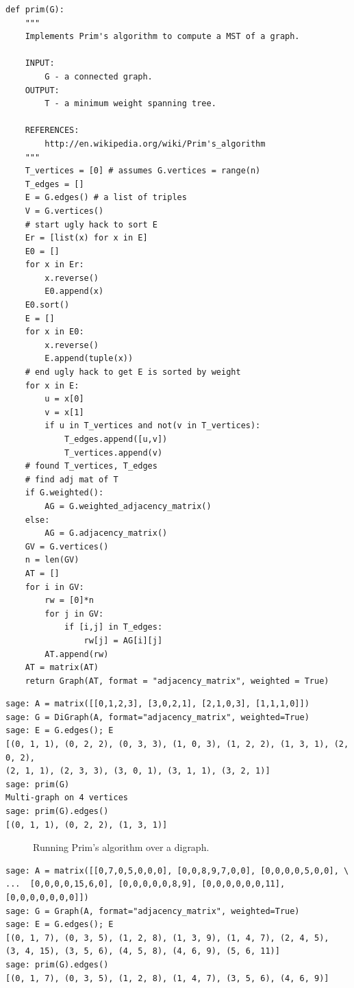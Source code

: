 \begin{lstlisting}
def prim(G):
    """
    Implements Prim's algorithm to compute a MST of a graph.

    INPUT:
        G - a connected graph.
    OUTPUT:
        T - a minimum weight spanning tree.

    REFERENCES:
        http://en.wikipedia.org/wiki/Prim's_algorithm
    """
    T_vertices = [0] # assumes G.vertices = range(n)
    T_edges = []
    E = G.edges() # a list of triples
    V = G.vertices()
    # start ugly hack to sort E
    Er = [list(x) for x in E]
    E0 = []
    for x in Er:
        x.reverse()
        E0.append(x)
    E0.sort()
    E = []
    for x in E0:
        x.reverse()
        E.append(tuple(x))
    # end ugly hack to get E is sorted by weight
    for x in E:
        u = x[0]
        v = x[1]
        if u in T_vertices and not(v in T_vertices):
            T_edges.append([u,v])
            T_vertices.append(v)
    # found T_vertices, T_edges
    # find adj mat of T
    if G.weighted():
        AG = G.weighted_adjacency_matrix()
    else:
        AG = G.adjacency_matrix()
    GV = G.vertices()
    n = len(GV)
    AT = []
    for i in GV:
        rw = [0]*n
        for j in GV:
            if [i,j] in T_edges:
                rw[j] = AG[i][j]
        AT.append(rw)
    AT = matrix(AT)
    return Graph(AT, format = "adjacency_matrix", weighted = True)
\end{lstlisting}

\begin{lstlisting}
sage: A = matrix([[0,1,2,3], [3,0,2,1], [2,1,0,3], [1,1,1,0]])
sage: G = DiGraph(A, format="adjacency_matrix", weighted=True)
sage: E = G.edges(); E
[(0, 1, 1), (0, 2, 2), (0, 3, 3), (1, 0, 3), (1, 2, 2), (1, 3, 1), (2, 0, 2),
(2, 1, 1), (2, 3, 3), (3, 0, 1), (3, 1, 1), (3, 2, 1)]
sage: prim(G)
Multi-graph on 4 vertices
sage: prim(G).edges()
[(0, 1, 1), (0, 2, 2), (1, 3, 1)]
\end{lstlisting}

\begin{figure}[!htbp]
\centering
{}

\caption{Running Prim's algorithm over a digraph.}
\label{fig:tree_forests:Prim_algorithm_digraph}
\end{figure}

\begin{lstlisting}
sage: A = matrix([[0,7,0,5,0,0,0], [0,0,8,9,7,0,0], [0,0,0,0,5,0,0], \
...  [0,0,0,0,15,6,0], [0,0,0,0,0,8,9], [0,0,0,0,0,0,11], [0,0,0,0,0,0,0]])
sage: G = Graph(A, format="adjacency_matrix", weighted=True)
sage: E = G.edges(); E
[(0, 1, 7), (0, 3, 5), (1, 2, 8), (1, 3, 9), (1, 4, 7), (2, 4, 5),
(3, 4, 15), (3, 5, 6), (4, 5, 8), (4, 6, 9), (5, 6, 11)]
sage: prim(G).edges()
[(0, 1, 7), (0, 3, 5), (1, 2, 8), (1, 4, 7), (3, 5, 6), (4, 6, 9)]
\end{lstlisting}

